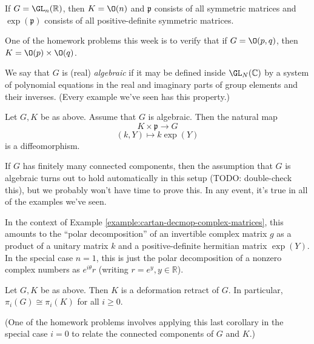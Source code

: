 \documentclass[reqno]{amsart} 
\begin{document}
\begin{example}\label{example:cartan-decmop-real-matrices}
  If $G = \GL_n(\mathbb{R})$, then $K = \O(n)$ and $\mathfrak{p}$ consists of all symmetric matrices and $\exp(\mathfrak{p})$ consists of all positive-definite symmetric matrices.
\end{example}
\begin{example}
  One of the homework problems this week is to verify that if $G = \O(p,q)$, then $K = \O(p) \times \O(q)$.
\end{example}

\begin{definition}
  We say that $G$ is (real) \emph{algebraic} if it may be defined inside $\GL_N(\mathbb{C})$ by a system of polynomial equations in the real and imaginary parts of group elements and their inverses.  (Every example we've seen has this property.)
\end{definition}

\begin{theorem}\label{thm:cartan-decomp}
  Let $G,K$ be as above.  Assume that $G$ is algebraic.  Then the natural map
  \begin{equation*}
    K \times \mathfrak{p} \rightarrow G
  \end{equation*}
  \begin{equation*}
    (k,Y) \mapsto k \exp(Y)
  \end{equation*}
  is a diffeomorphism.
\end{theorem}

\begin{remark}
  If $G$ has finitely many connected components, then the assumption that $G$ is algebraic turns out to hold automatically in this setup (TODO: double-check this), but we probably won't have time to prove this.  In any event, it's true in all of the examples we've seen.
\end{remark}

\begin{example}\label{example:polar-decomp}
  In the context of Example \ref{example:cartan-decmop-complex-matrices}, this amounts to the ``polar decomposition'' of an invertible complex matrix $g$ as a product of a unitary matrix $k$ and a positive-definite hermitian matrix $\exp(Y)$.  In the special case $n = 1$, this is just the polar decomposition of a nonzero complex numbers as $e^{i \theta} r$ (writing $r = e^y, y \in \mathbb{R}$).
\end{example}

\begin{corollary}
  Let $G,K$ be as above.  Then $K$ is a deformation retract of $G$.  In particular, $\pi_i(G) \cong \pi_i(K)$ for all $i \geq 0$.
\end{corollary}
(One of the homework problems involves applying this last corollary in the special case $i=0$ to relate the connected components of $G$ and $K$.)
\end{document}
